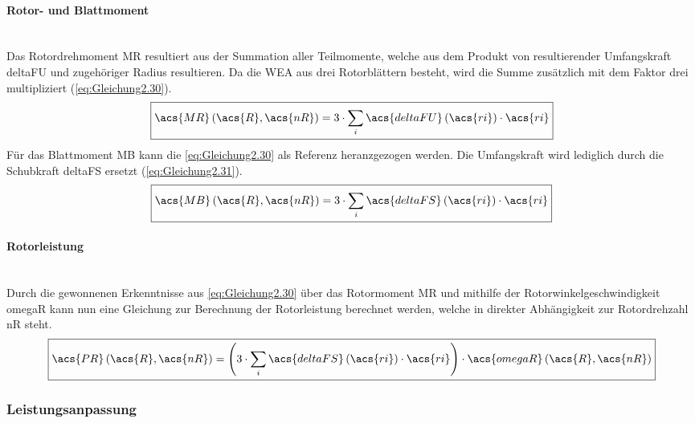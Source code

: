 \paragraph{Rotor- und Blattmoment}\mbox{}\smallskip\\
Das Rotordrehmoment \acs{MR} resultiert aus der Summation aller Teilmomente, welche aus dem Produkt von resultierender Umfangskraft \acs{deltaFU} und zugehöriger Radius resultieren. Da die WEA aus drei Rotorblättern besteht, wird die Summe zusätzlich mit dem Faktor drei multipliziert (\autoref{eq:Gleichung2.30}).
\begin{equation}\label{eq:Gleichung2.30}
    \boxed{\acs{MR}\left(\acs{R}, \acs{nR}\right) = 3 \cdot \sum_{i}^{} \acs{deltaFU}\left(\acs{ri}\right) \cdot \acs{ri}}
\end{equation}
\newline
Für das Blattmoment \acs{MB} kann die \autoref{eq:Gleichung2.30} als Referenz heranzgezogen werden. Die Umfangskraft wird lediglich durch die Schubkraft \acs{deltaFS} ersetzt (\autoref{eq:Gleichung2.31}).
\begin{equation}\label{eq:Gleichung2.31}
    \boxed{\acs{MB}\left(\acs{R}, \acs{nR}\right) = 3 \cdot \sum_{i}^{} \acs{deltaFS}\left(\acs{ri}\right) \cdot \acs{ri}}
\end{equation}

\paragraph{Rotorleistung}\mbox{}\smallskip\\
Durch die gewonnenen Erkenntnisse aus \autoref{eq:Gleichung2.30} über das Rotormoment \acs{MR} und mithilfe der Rotorwinkelgeschwindigkeit \acs{omegaR} kann nun eine Gleichung zur Berechnung der Rotorleistung berechnet werden, welche in direkter Abhängigkeit zur Rotordrehzahl \acs{nR} steht.
\begin{equation}
    \boxed{\acs{PR}\left(\acs{R}, \acs{nR}\right) = \left(3 \cdot \sum_{i}^{} \acs{deltaFS}\left(\acs{ri}\right) \cdot \acs{ri}\right) \cdot \acs{omegaR}\left(\acs{R}, \acs{nR}\right)}
\end{equation}
\newpage
\subsubsection{Leistungsanpassung}

